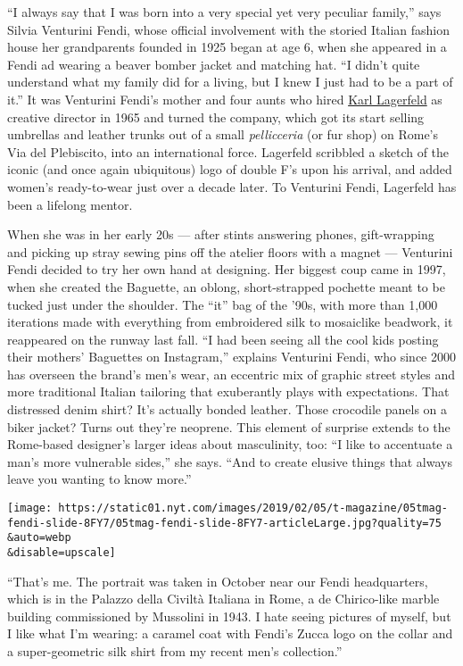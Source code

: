 ``I always say that I was born into a very special yet very peculiar
family,'' says Silvia Venturini Fendi, whose official involvement with
the storied Italian fashion house her grandparents founded in 1925 began
at age 6, when she appeared in a Fendi ad wearing a beaver bomber jacket
and matching hat. ``I didn't quite understand what my family did for a
living, but I knew I just had to be a part of it.'' It was Venturini
Fendi's mother and four aunts who hired
\href{https://www.nytimes.com/2015/10/12/t-magazine/karl-lagerfeld-interview.html}{Karl
Lagerfeld} as creative director in 1965 and turned the company, which
got its start selling umbrellas and leather trunks out of a small
\emph{pellicceria} (or fur shop) on Rome's Via del Plebiscito, into an
international force. Lagerfeld scribbled a sketch of the iconic (and
once again ubiquitous) logo of double F's upon his arrival, and added
women's ready-to-wear just over a decade later. To Venturini Fendi,
Lagerfeld has been a lifelong mentor.

When she was in her early 20s --- after stints answering phones,
gift-wrapping and picking up stray sewing pins off the atelier floors
with a magnet --- Venturini Fendi decided to try her own hand at
designing. Her biggest coup came in 1997, when she created the Baguette,
an oblong, short-strapped pochette meant to be tucked just under the
shoulder. The ``it'' bag of the '90s, with more than 1,000 iterations
made with everything from embroidered silk to mosaiclike beadwork, it
reappeared on the runway last fall. ``I had been seeing all the cool
kids posting their mothers' Baguettes on Instagram,'' explains Venturini
Fendi, who since 2000 has overseen the brand's men's wear, an eccentric
mix of graphic street styles and more traditional Italian tailoring that
exuberantly plays with expectations. That distressed denim shirt? It's
actually bonded leather. Those crocodile panels on a biker jacket? Turns
out they're neoprene. This element of surprise extends to the Rome-based
designer's larger ideas about masculinity, too: ``I like to accentuate a
man's more vulnerable sides,'' she says. ``And to create elusive things
that always leave you wanting to know more.''

\texttt{[image: https://static01.nyt.com/images/2019/02/05/t-magazine/05tmag-fendi-slide-8FY7/05tmag-fendi-slide-8FY7-articleLarge.jpg?quality=75\\\&auto=webp\\\&disable=upscale]}

``That's me. The portrait was taken in October near our Fendi
headquarters, which is in the Palazzo della Civiltà Italiana in Rome, a
de Chirico-like marble building commissioned by Mussolini in 1943. I
hate seeing pictures of myself, but I like what I'm wearing: a caramel
coat with Fendi's Zucca logo on the collar and a super-geometric silk
shirt from my recent men's collection.''

